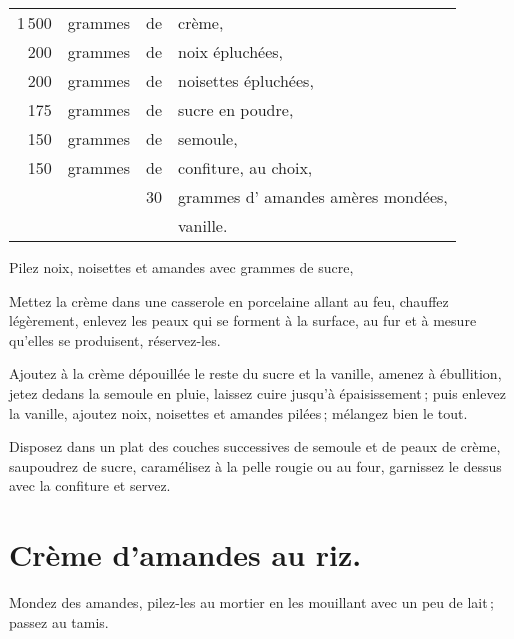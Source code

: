 \footnotesize
\begin{longtable}{rrrp{16em}}
  1 500 & grammes & de & crème,                                                                           \\
    200 & grammes & de & noix épluchées,                                                                  \\
    200 & grammes & de & noisettes épluchées,                                                             \\
    175 & grammes & de & sucre en poudre,                                                                 \\
    150 & grammes & de & semoule,                                                                         \\
    150 & grammes & de & confiture, au choix,                                                             \\
        &         & 30 & grammes d' amandes amères mondées,                                               \\
        &         &    & vanille.                                                                         \\
\end{longtable}
\normalsize

Pilez noix, noisettes et amandes avec {\mmm} grammes de sucre,

Mettez la crème dans une casserole en porcelaine allant au feu, chauffez
légèrement, enlevez les peaux qui se forment à la surface, au fur et à mesure
qu'elles se produisent, réservez-les.

Ajoutez à la crème dépouillée le reste du sucre et la vanille, amenez
à ébullition, jetez dedans la semoule en pluie, laissez cuire jusqu'à
épaisissement ; puis enlevez la vanille, ajoutez noix, noisettes et amandes
pilées ; mélangez bien le tout.

Disposez dans un plat des couches successives de semoule et de peaux de
crème, saupoudrez de sucre, caramélisez à la pelle rougie ou au four, garnissez le
dessus avec la confiture et servez.

\section*{\centering Crème d'amandes au riz.}
{}

Mondez des amandes, pilez-les au mortier en les mouillant avec un peu de lait ;
passez au tamis.

